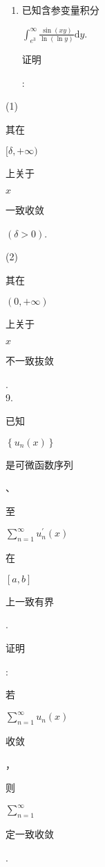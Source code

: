 \documentclass[10pt]{article}
\begin{document}
\begin{enumerate}
  \item \begin{CJK}{UTF8}{mj}已知含参变量积分\end{CJK} $\int_{e^{3}}^{\infty} \frac{\sin (x y)}{\ln (\ln y)} \mathrm{d} y$. \begin{CJK}{UTF8}{mj}证明\end{CJK}:

\end{enumerate}
(1) \begin{CJK}{UTF8}{mj}其在\end{CJK} $[\delta,+\infty)$ \begin{CJK}{UTF8}{mj}上关于\end{CJK} $x$ \begin{CJK}{UTF8}{mj}一致收敛\end{CJK} $(\delta>0)$.

(2) \begin{CJK}{UTF8}{mj}其在\end{CJK} $(0,+\infty)$ \begin{CJK}{UTF8}{mj}上关于\end{CJK} $x$ \begin{CJK}{UTF8}{mj}不一致抜敛\end{CJK}.\\
9. \begin{CJK}{UTF8}{mj}已知\end{CJK} $\left\{u_{n}(x)\right\}$ \begin{CJK}{UTF8}{mj}是可微函数序列\end{CJK}、\begin{CJK}{UTF8}{mj}至\end{CJK} $\sum_{n=1}^{\infty} u_{n}^{\prime}(x)$ \begin{CJK}{UTF8}{mj}在\end{CJK} $[a, b]$ \begin{CJK}{UTF8}{mj}上一致有界\end{CJK}. \begin{CJK}{UTF8}{mj}证明\end{CJK}: \begin{CJK}{UTF8}{mj}若\end{CJK} $\sum_{n=1}^{\infty} u_{n}(x)$ \begin{CJK}{UTF8}{mj}收敛\end{CJK}，\begin{CJK}{UTF8}{mj}则\end{CJK} $\sum_{n=1}^{\infty}$ \begin{CJK}{UTF8}{mj}定一致收敛\end{CJK}.
\end{document}
